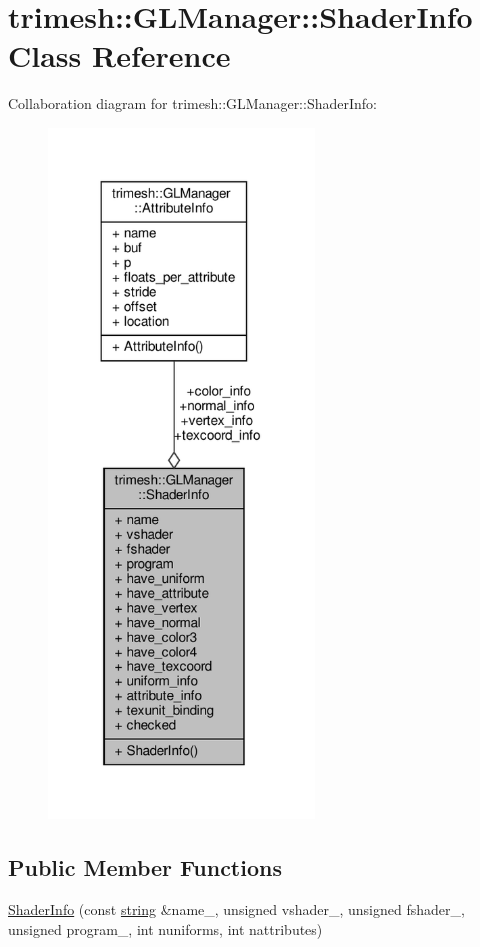 \hypertarget{classtrimesh_1_1GLManager_1_1ShaderInfo}{}\section{trimesh\+:\+:G\+L\+Manager\+:\+:Shader\+Info Class Reference}
\label{classtrimesh_1_1GLManager_1_1ShaderInfo}


Collaboration diagram for trimesh\+:\+:G\+L\+Manager\+:\+:Shader\+Info\+:\nopagebreak
\begin{figure}[H]
\begin{center}
\leavevmode
\includegraphics[width=200pt]{d3/d49/classtrimesh_1_1GLManager_1_1ShaderInfo__coll__graph}
\end{center}
\end{figure}
\subsection*{Public Member Functions}
\begin{DoxyCompactItemize}
\item 
\hyperlink{classtrimesh_1_1GLManager_1_1ShaderInfo_a930aa666ff8c7b9a7004077be432adfb}{Shader\+Info} (const \hyperlink{namespacetrimesh_a51b4a31323874089623d4b17afabc1aa}{string} \&name\+\_\+, unsigned vshader\+\_\+, unsigned fshader\+\_\+, unsigned program\+\_\+, int nuniforms, int nattributes)
\end{DoxyCompactItemize}

